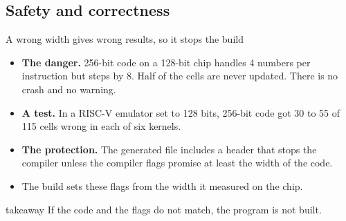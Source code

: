 \documentclass[aspectratio=169,10pt,t]{beamer}
\newcommand{\takeaway}[1]{\par\vfill
  \begin{beamercolorbox}[wd=\textwidth,sep=4pt,rounded=true]{takeaway}
    \small #1
  \end{beamercolorbox}}
\begin{document}
\subsection{Safety and correctness}
\begin{frame}{A wrong width gives wrong results, so it stops the build}
  \vspace{2mm}
  \begin{itemize}
    \item \textbf{The danger.} 256-bit code on a 128-bit chip handles 4 numbers per instruction but steps by 8.
          Half of the cells are never updated. There is no crash and no warning.
    \item \textbf{A test.} In a RISC-V emulator set to 128 bits, 256-bit code got 30 to 55 of 115 cells wrong in
          each of six kernels.
    \item \textbf{The protection.} The generated file includes a header that stops the compiler unless the
          compiler flags promise at least the width of the code.
    \item The build sets these flags from the width it measured on the chip.
  \end{itemize}
  \takeaway{If the code and the flags do not match, the program is not built.}
\end{frame}
\end{document}
